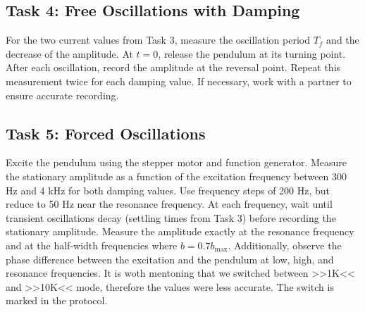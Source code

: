 \subsection*{Task 4: Free Oscillations with Damping}
For the two current values from Task 3, measure the oscillation period $T_f$ and the decrease of the amplitude. At $t=0$, release the pendulum at its turning point. After each oscillation, record the amplitude at the reversal point. Repeat this measurement twice for each damping value. If necessary, work with a partner to ensure accurate recording.

\subsection*{Task 5: Forced Oscillations}
Excite the pendulum using the stepper motor and function generator. Measure the stationary amplitude as a function of the excitation frequency between 300 Hz and 4 kHz for both damping values. Use frequency steps of 200 Hz, but reduce to 50 Hz near the resonance frequency.  
At each frequency, wait until transient oscillations decay (settling times from Task 3) before recording the stationary amplitude. Measure the amplitude exactly at the resonance frequency and at the half-width frequencies where $b = 0.7 b_\text{max}$. Additionally, observe the phase difference between the excitation and the pendulum at low, high, and resonance frequencies.
It is woth mentoning that we switched between >>1K<< and >>10K<< mode, therefore the values were less accurate. The switch is marked in the protocol.